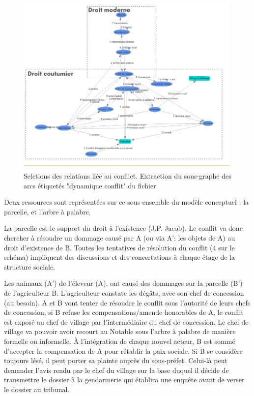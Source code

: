 \begin{figure}
  \begin{center}
    \includegraphics[width=0.99\textwidth]{img/zoneDroitConflits.png}
  \end{center}
  \caption{Selctions des relations liée au conflict. Extraction du sous-graphe des arcs étiquetés "dynamique conflit" du fichier}
  \label{fig:conflict}
\end{figure}

Deux ressources sont représentées sur ce sous-ensemble du modèle conceptuel : la parcelle, et l'arbre à palabre.

La parcelle est le support du droit à l'existence (J.P. Jacob). Le conflit va donc chercher à résoudre un dommage causé par A (ou via A': les objets de A) au droit d'existence de B. Toutes les tentatives de résolution du conflit (4 sur le schéma) impliquent des discussions et des concertations à chaque étage de la structure sociale.

Les animaux (A') de l'éleveur (A), ont causé des dommages sur la parcelle (B') de l'agriculteur B. L'agriculteur constate les dégâts, avec son chef de concession (au besoin). A et B vont tenter de résoudre le conflit sous l'autorité de leurs chefs de concession, si B refuse les compensations/amende honorables de A, le conflit est exposé au chef de village par l'intermédiaire du chef de concession. Le chef de village va pouvoir avoir recourt au Notable sous l'arbre à palabre de manière formelle ou informelle. À l'intégration de chaque nouvel acteur, B est sommé d'accepter la compensation de A pour rétablir la paix sociale. Si B se considère toujours lésé, il peut porter sa plainte auprès du sous-préfet. Celui-là peut demander l'avis rendu par le chef du village sur la base duquel il décide de transmettre le dossier à la gendarmerie qui établira une enquête avant de verser le dossier au tribunal.

